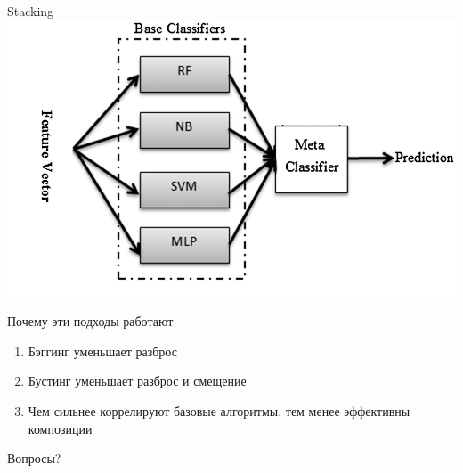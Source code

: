 \documentclass[10pt]{beamer}
\begin{document}
\begin{frame}{Stacking}
    \centering
    \includegraphics[width=0.9 \textwidth, keepaspectratio]{images/stacking}
\end{frame}

\begin{frame}{Почему эти подходы работают}
  \begin{enumerate}
    \item Бэггинг уменьшает разброс
    \item Бустинг уменьшает разброс и смещение
    \item Чем сильнее коррелируют базовые алгоритмы, тем менее эффективны композиции
  \end{enumerate}
\end{frame}

\begin{frame}[standout]
  Вопросы?
\end{frame}

\appendix
\end{document}
